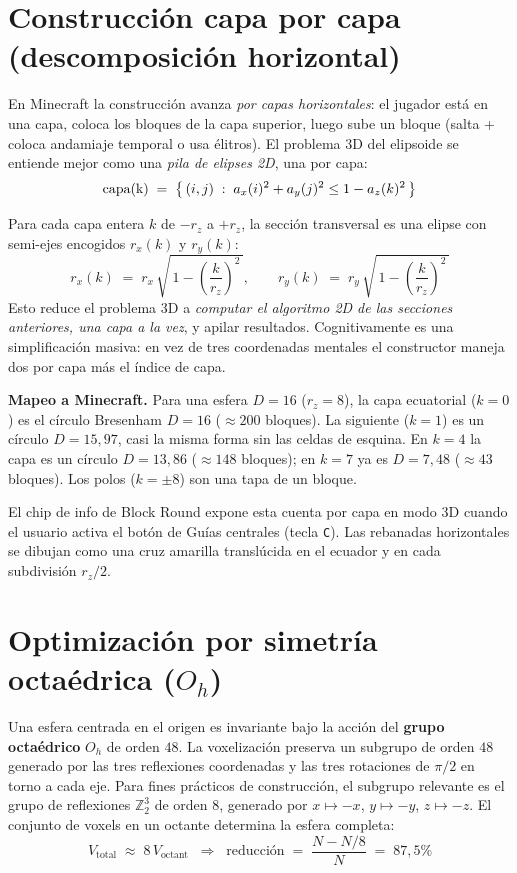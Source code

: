 \documentclass[12pt,a4paper]{scrartcl}
\newcommand{\code}[1]{\texttt{\small #1}}
\newcommand{\acc}[1]{\textcolor{accent}{\textbf{#1}}}
\begin{document}
\section{Construcción capa por capa (descomposición horizontal)}

En Minecraft la construcción avanza \emph{por capas horizontales}: el jugador está en una capa, coloca los bloques de la capa superior, luego sube un bloque (salta + coloca andamiaje temporal o usa élitros). El problema 3D del elipsoide se entiende mejor como una \emph{pila de elipses 2D}, una por capa:
\[
\text{\text{capa}(k)} \;=\; \bigl\{\,(i,j)\;:\;a_x(i)^2 + a_y(j)^2 \leq 1 - a_z(k)^2\,\bigr\}
\]

Para cada capa entera $k$ de $-r_z$ a $+r_z$, la sección transversal es una elipse con semi-ejes encogidos $r_x(k)$ y $r_y(k)$:
\[
r_x(k) \;=\; r_x\,\sqrt{\,1 - \left(\dfrac{k}{r_z}\right)^{\!2}\,},
\qquad
r_y(k) \;=\; r_y\,\sqrt{\,1 - \left(\dfrac{k}{r_z}\right)^{\!2}\,}
\]
Esto reduce el problema 3D a \emph{computar el algoritmo 2D de las secciones anteriores, una capa a la vez}, y apilar resultados. Cognitivamente es una simplificación masiva: en vez de tres coordenadas mentales el constructor maneja dos por capa más el índice de capa.

\begin{minec}
\textbf{Mapeo a Minecraft.} Para una esfera $D=16$ ($r_z = 8$), la capa ecuatorial ($k=0$) es el círculo Bresenham $D=16$ ($\approx 200$ bloques). La siguiente ($k=1$) es un círculo $D=15{,}97$, casi la misma forma sin las celdas de esquina. En $k=4$ la capa es un círculo $D=13{,}86$ ($\approx 148$ bloques); en $k=7$ ya es $D=7{,}48$ ($\approx 43$ bloques). Los polos ($k = \pm 8$) son una tapa de un bloque.
\end{minec}

El chip de info de Block Round expone esta cuenta por capa en modo 3D cuando el usuario activa el botón de Guías centrales (tecla \code{C}). Las rebanadas horizontales se dibujan como una cruz amarilla translúcida en el ecuador y en cada subdivisión $r_z/2$.

\section{Optimización por simetría octaédrica ($O_h$)}

Una esfera centrada en el origen es invariante bajo la acción del \acc{grupo octaédrico} $O_h$ de orden $48$. La voxelización preserva un subgrupo de orden $48$ generado por las tres reflexiones coordenadas y las tres rotaciones de $\pi/2$ en torno a cada eje. Para fines prácticos de construcción, el subgrupo relevante es el grupo de reflexiones $\mathbb{Z}_2^3$ de orden $8$, generado por $x \mapsto -x$, $y \mapsto -y$, $z \mapsto -z$. El conjunto de voxels en un octante determina la esfera completa:
\[
V_{\mathrm{total}} \;\approx\; 8\,V_{\mathrm{octant}}\;\;\Longrightarrow\;\;
\text{reducción}\;=\;\frac{N - N/8}{N} \;=\; 87{,}5\%
\]
\end{document}
